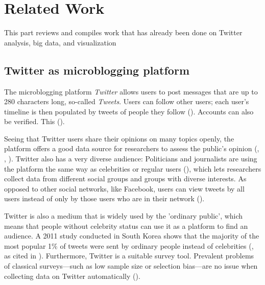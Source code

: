 \section{Related Work}
This part reviews and compiles work that has already been done on Twitter analysis, big data, and visualization

\subsection{Twitter as microblogging platform}
The microblogging platform \emph{Twitter} allows users to post messages that are up to 280 characters long, so-called \emph{Tweets}. Users can follow other users; each user's timeline is then populated by tweets of people they follow (\cite{thimmTwitterAlsWahlkampfmedium2012}). Accounts can also be verified. This  (\cite{twitterinc.VerifiedAccounts}). 

Seeing that Twitter users share their opinions on many topics openly, the platform offers a good data source for researchers to assess the public's opinion (\cite{pak2010twitter}, \cite{pfaffenberger2016twitter}, \cite{broniatowski2014twitter}). Twitter also has a very diverse audience: Politicians and journalists are using the platform the same way as celebrities or regular users (\cite{pak2010twitter}), which lets researchers collect data from different social groups and groups with diverse interests. As opposed to other social networks, like Facebook, users can view tweets by all users instead of only by those users who are in their network (\cite{parkDoesTwitterMotivate2013}).

Twitter is also a medium that is widely used by the 'ordinary public', which means that people without celebrity status can use it as a platform to find an audience. A 2011 study conducted in South Korea shows that the majority of the most popular 1\% of tweets were sent by ordinary people instead of celebrities (\cite{chang2011structure}, as cited in \cite{parkDoesTwitterMotivate2013}). Furthermore, Twitter is a suitable survey tool. Prevalent problems of classical surveys---such as low sample size or selection bias---are no issue when collecting data on Twitter automatically (\cite{takabeTwitterSurveyTool2016}). 

